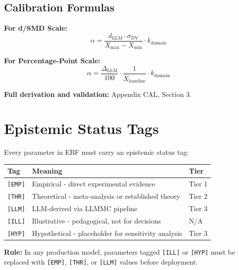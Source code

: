 \subsection{Calibration Formulas}

\textbf{For d/SMD Scale:}
$$\alpha = \frac{d_{\text{LLM}} \cdot \sigma_{\text{DV}}}{X_{\max} - X_{\min}} \cdot k_{\text{domain}}$$

\textbf{For Percentage-Point Scale:}
$$\alpha = \frac{\Delta_{\text{LLM}}}{100} \cdot \frac{1}{\bar{X}_{\text{baseline}}} \cdot k_{\text{domain}}$$

\textbf{Full derivation and validation:} Appendix CAL, Section 3.


\section{Epistemic Status Tags}
\label{sec:pm-tags}

Every parameter in EBF must carry an epistemic status tag:

\begin{center}
\begin{tabular}{lll}
\toprule
\textbf{Tag} & \textbf{Meaning} & \textbf{Tier} \\
\midrule
\texttt{[EMP]} & Empirical - direct experimental evidence & Tier 1 \\
\texttt{[THR]} & Theoretical - meta-analysis or established theory & Tier 2 \\
\texttt{[LLM]} & LLM-derived via LLMMC pipeline & Tier 3 \\
\texttt{[ILL]} & Illustrative - pedagogical, not for decisions & N/A \\
\texttt{[HYP]} & Hypothetical - placeholder for sensitivity analysis & Tier 3 \\
\bottomrule
\end{tabular}
\end{center}

\textbf{Rule:} In any production model, parameters tagged \texttt{[ILL]} or \texttt{[HYP]} must be replaced with \texttt{[EMP]}, \texttt{[THR]}, or \texttt{[LLM]} values before deployment.


